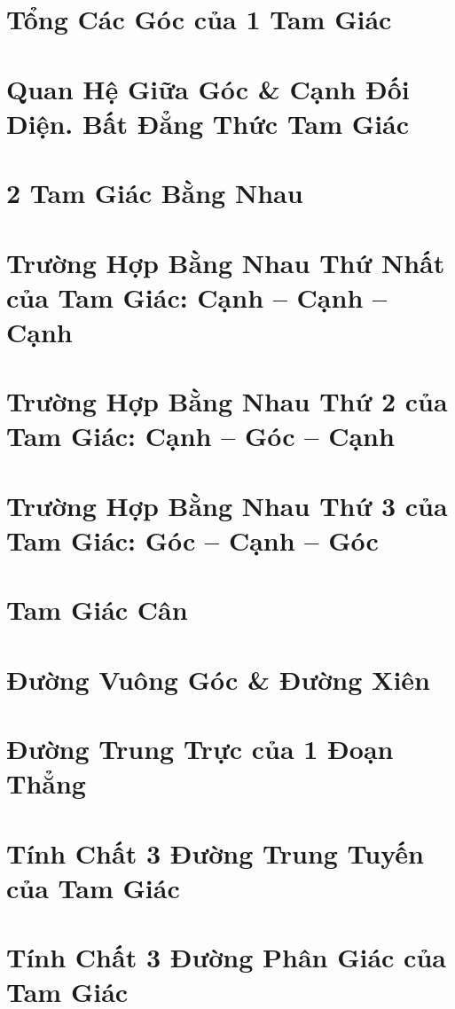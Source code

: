 \documentclass[oneside]{book}
\numberwithin{equation}{section}
\begin{document}
\section{Tổng Các Góc của 1 Tam Giác}

\section{Quan Hệ Giữa Góc \& Cạnh Đối Diện. Bất Đẳng Thức Tam Giác}

\section{2 Tam Giác Bằng Nhau}

\section{Trường Hợp Bằng Nhau Thứ Nhất của Tam Giác: Cạnh -- Cạnh -- Cạnh}

\section{Trường Hợp Bằng Nhau Thứ 2 của Tam Giác: Cạnh -- Góc -- Cạnh}

\section{Trường Hợp Bằng Nhau Thứ 3 của Tam Giác: Góc -- Cạnh -- Góc}

\section{Tam Giác Cân}

\section{Đường Vuông Góc \& Đường Xiên}

\section{Đường Trung Trực của 1 Đoạn Thẳng}

\section{Tính Chất 3 Đường Trung Tuyến của Tam Giác}

\section{Tính Chất 3 Đường Phân Giác của Tam Giác}
\end{document}
